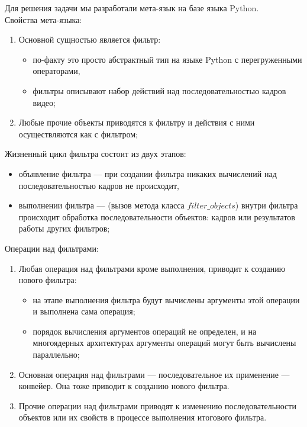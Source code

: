 \begin{note-frame}
    Для решения задачи мы разработали мета-язык 
    на базе языка Python.\\
    Свойства мета-языка:
    \begin{enumerate}
        \item Основной сущностью является фильтр:
        \begin{itemize}
            \item по-факту это просто абстрактный тип 
            на языке Python с перегруженными операторами,
            \item фильтры описывают набор действий 
            над последовательностью кадров видео;
        \end{itemize}
        \item Любые прочие объекты приводятся 
        к фильтру и действия 
        с ними осуществляются как с фильтром;
    \end{enumerate}
\end{note-frame}

\begin{note-frame}
    Жизненный цикл фильтра состоит из двух этапов:
    \begin{itemize}
        \item объявление фильтра 
        — при создании фильтра никаких вычислений 
        над последовательностью кадров не происходит,
        \item выполнении фильтра 
        — (вызов метода класса $filter\_objects$) 
        внутри фильтра происходит обработка 
        последовательности объектов: 
        кадров или результатов работы других фильтров;
    \end{itemize}
\end{note-frame}

\begin{note-frame}
    Операции над фильтрами:
    \begin{enumerate}
        \item Любая операция над фильтрами кроме выполнения,
        приводит к созданию нового фильтра:
        \begin{itemize}
            \item на этапе выполнения фильтра будут вычислены 
            аргументы этой операции и выполнена сама операция;
            \item порядок вычисления аргументов операций не определен, и на 
            многоядерных архитектурах аргументы операций могут быть вычислены 
            параллельно;
        \end{itemize}
        \item Основная операция над фильтрами — последовательное их применение — конвейер. Она тоже приводит к созданию нового фильтра.
        \item Прочие операции над фильтрами приводят 
        к изменению последовательности объектов или их свойств
        в процессе выполнения итогового фильтра.
    \end{enumerate}
\end{note-frame}

